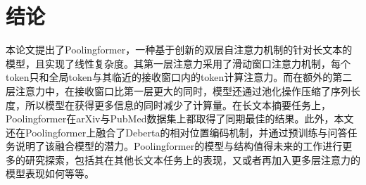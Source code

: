 \chapter{结论}

本论文提出了Poolingformer，一种基于创新的双层自注意力机制的针对长文本的模型，且实现了线性复杂度。其第一层注意力采用了滑动窗口注意力机制，每个token只和全局token与其临近的接收窗口内的token计算注意力。而在额外的第二层注意力中，在接收窗口比第一层更大的同时，模型还通过池化操作压缩了序列长度，所以模型在获得更多信息的同时减少了计算量。在长文本摘要任务上，Poolingformer在arXiv与PubMed数据集上都取得了同期最佳的结果。此外，本文还在Poolingformer上融合了Deberta的相对位置编码机制，并通过预训练与问答任务说明了该融合模型的潜力。Poolingformer的模型与结构值得未来的工作进行更多的研究探索，包括其在其他长文本任务上的表现，又或者再加入更多层注意力的模型表现如何等等。